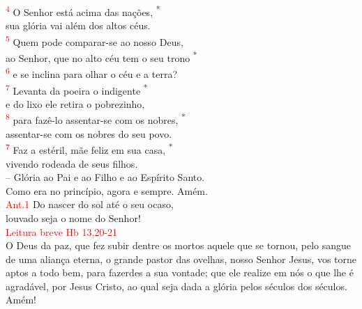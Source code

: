 \documentclass{book}
\begin{document}
\begin{center}
    \textsuperscript{\underline{\hspace{.07in}}\textcolor{red}{4}} O Senhor está acima das nações, \textsuperscript{*} \\
    sua glória vai além dos altos céus.\\
    \textsuperscript{\underline{\hspace{.07in}}\textcolor{red}{5}} Quem pode comparar-se ao nosso Deus, \dag{} \\
    ao Senhor, que no alto céu tem o seu trono \textsuperscript{*} \\
    \textsuperscript{\underline{\hspace{.07in}}\textcolor{red}{6}} e se inclina para olhar o céu e a terra?
    \vspace{.2cm} \\
    \textsuperscript{\underline{\hspace{.07in}}\textcolor{red}{7}} Levanta da poeira o indigente \textsuperscript{*} \\
    e do lixo ele retira o pobrezinho, \\
    \textsuperscript{\underline{\hspace{.07in}}\textcolor{red}{8}} para fazê-lo assentar-se com os nobres, \textsuperscript{*} \\
    assentar-se com os nobres do seu povo. \\
    \textsuperscript{\underline{\hspace{.07in}}\textcolor{red}{7}} Faz a estéril, mãe feliz em sua casa, \textsuperscript{*} \\
    vivendo rodeada de seus filhos.
    \vspace{.2cm} \\
    -- Glória ao Pai e ao Filho e ao Espírito Santo. \\
    Como era no princípio, agora e sempre. Amém.
    \vspace{.2cm} \\
    \textcolor{red}{Ant.1} Do nascer do sol até o seu ocaso, \\
    louvado seja o nome do Senhor!
    \vspace{.2cm} \\
    \textcolor{red}{Leitura breve Hb 13,20-21}
    \vspace{.2cm} \\
    O Deus da paz, que fez subir dentre os mortos aquele que se tornou, pelo sangue de uma aliança eterna, o grande pastor das ovelhas, nosso Senhor Jesus, vos torne aptos a todo bem, para fazerdes a sua vontade; que ele realize em nós o que lhe é agradável, por Jesus Cristo, ao qual seja dada a glória pelos séculos dos séculos. Amém!

\end{center}
\end{document}
